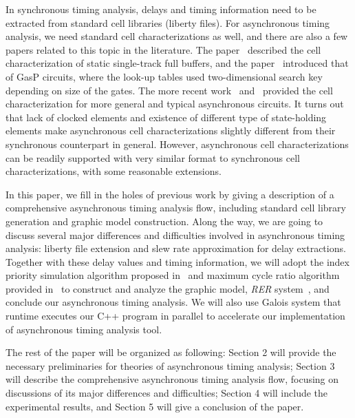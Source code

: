 \documentclass[sigconf, 10pt, twocolumn]{acmart}
\begin{document}
In synchronous timing analysis, delays and timing information need to be extracted from standard cell libraries (liberty files). For asynchronous timing analysis, we need standard cell characterizations as well, and there are also a few papers related to this topic in the literature. The paper~\cite{Prakash:Library} described the cell characterization of static single-track full buffers, and the paper~\cite{Gilla:Library} introduced that of GasP circuits, where the look-up tables used two-dimensional search key depending on size of the gates. The more recent work~\cite{Moreira:LiChEn} and~\cite{Moreira:Automated} provided the cell characterization for more general and typical asynchronous circuits. It turns out that lack of clocked elements and existence of different type of state-holding elements make asynchronous cell characterizations slightly different from their synchronous counterpart in general. However, asynchronous cell characterizations can be readily supported with very similar format to synchronous cell characterizations, with some reasonable extensions.



In this paper, we fill in the holes of previous work by giving a description of a comprehensive asynchronous timing analysis flow, including standard cell library generation and graphic model construction. Along the way, we are going to discuss several major differences and difficulties involved in asynchronous timing analysis: liberty file extension and slew rate approximation for delay extractions. Together with these delay values and timing information, we will adopt the index priority simulation algorithm proposed in~\cite{Lee:Analysis} and maximum cycle ratio algorithm provided in~\cite{Karp:Parametric,Neal:Faster} to construct and analyze the graphic model, {\it RER\/} system~\cite{Burns:Peformance}, and conclude our asynchronous timing analysis. We will also use Galois system that runtime executes our C++ program in parallel to accelerate our implementation of asynchronous timing analysis tool.



The rest of the paper will be organized as following: Section 2 will provide the necessary preliminaries for theories of asynchronous timing analysis; Section 3 will describe the comprehensive asynchronous timing analysis flow, focusing on discussions of its major differences and difficulties; Section 4 will include the experimental results, and Section 5 will give a conclusion of the paper.
\end{document}
